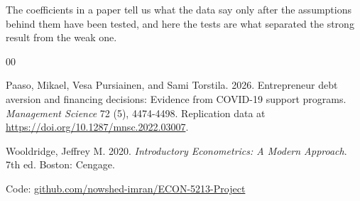 \documentclass[preprint,letterpaper,11pt,authoryear]{elsarticle}
\begin{document}
The coefficients in a paper tell us what the data say only after the assumptions behind them have been tested, and here the tests are what separated the strong result from the weak one.

\begin{thebibliography}{00}

 Paaso, Mikael, Vesa Pursiainen, and Sami Torstila. 2026. Entrepreneur debt aversion and financing decisions: Evidence from COVID-19 support programs. \textit{Management Science} 72 (5), 4474-4498. Replication data at \url{https://doi.org/10.1287/mnsc.2022.03007}.

 Wooldridge, Jeffrey M. 2020. \textit{Introductory Econometrics: A Modern Approach}. 7th ed. Boston: Cengage.

\end{thebibliography}

\vspace{6pt}
\noindent Code: \href{https://github.com/nowshed-imran/ECON-5213-Project}{github.com/nowshed-imran/ECON-5213-Project}
\end{document}
